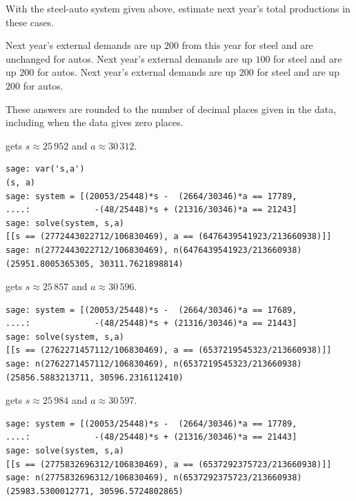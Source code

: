 \begin{exercises}
  \item 
    With the steel-auto system given above, estimate next year's
    total productions in these cases.
    \begin{exparts}
      \partsitem Next year's external demands are up $200$ from this
         year for steel and are unchanged for autos.
      \partsitem Next year's external demands are up $100$ for steel and
         are up $200$ for autos.
      \partsitem Next year's external demands are up $200$ for steel and
         are up $200$ for autos.
    \end{exparts} 
    \begin{answer}
      These answers are rounded to the number of decimal places given in 
      the data, including when the data gives zero places.
      \begin{exparts}
        \partsitem \Sage{} gets $s\approx 25\,952$ and $a\approx 30\,312$.
\begin{lstlisting}
sage: var('s,a')
(s, a)
sage: system = [(20053/25448)*s -  (2664/30346)*a == 17789,
....:             -(48/25448)*s + (21316/30346)*a == 21243]
sage: solve(system, s,a)
[[s == (2772443022712/106830469), a == (6476439541923/213660938)]]
sage: n(2772443022712/106830469), n(6476439541923/213660938)
(25951.8005365305, 30311.7621898814)          
\end{lstlisting}
        \partsitem \Sage{} gets $s\approx 25\,857$ and $a\approx 30\,596$.
\begin{lstlisting}
sage: system = [(20053/25448)*s -  (2664/30346)*a == 17689,
....:             -(48/25448)*s + (21316/30346)*a == 21443]
sage: solve(system, s,a)
[[s == (2762271457112/106830469), a == (6537219545323/213660938)]]
sage: n(2762271457112/106830469), n(6537219545323/213660938)
(25856.5883213711, 30596.2316112410)
\end{lstlisting}
        \partsitem \Sage{} gets $s\approx 25\,984$ and $a\approx 30\,597$.
\begin{lstlisting}
sage: system = [(20053/25448)*s -  (2664/30346)*a == 17789,
....:             -(48/25448)*s + (21316/30346)*a == 21443]
sage: solve(system, s,a)
[[s == (2775832696312/106830469), a == (6537292375723/213660938)]]
sage: n(2775832696312/106830469), n(6537292375723/213660938)
(25983.5300012771, 30596.5724802865)          
\end{lstlisting}
      \end{exparts}
    \end{answer}
  \item 

\end{exercises}

